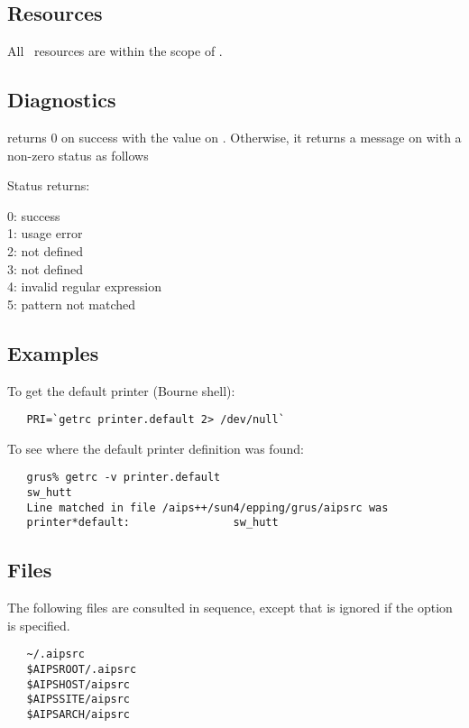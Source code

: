 \subsection*{Resources}

All \aipspp\ resources are within the scope of .

\subsection*{Diagnostics}

 returns 0 on success with the value on .  Otherwise,
it returns a message on  with a non-zero status as follows

Status returns:
\begin{status}
   0: success\\
   1: usage error\\
   2:  not defined\\
   3:  not defined\\
   4: invalid regular expression\\
   5: pattern not matched
\end{status}

\subsection*{Examples}

To get the default printer (Bourne shell):
\begin{verbatim}
   PRI=`getrc printer.default 2> /dev/null`
\end{verbatim}

\noindent
To see where the default printer definition was found:
\begin{verbatim}
   grus% getrc -v printer.default
   sw_hutt
   Line matched in file /aips++/sun4/epping/grus/aipsrc was
   printer*default:                sw_hutt
\end{verbatim}

\subsection*{Files}

The following  files are consulted in sequence, except that
 is ignored if the  option is specified.

\begin{verbatim}
   ~/.aipsrc
   $AIPSROOT/.aipsrc
   $AIPSHOST/aipsrc
   $AIPSSITE/aipsrc
   $AIPSARCH/aipsrc
\end{verbatim}

